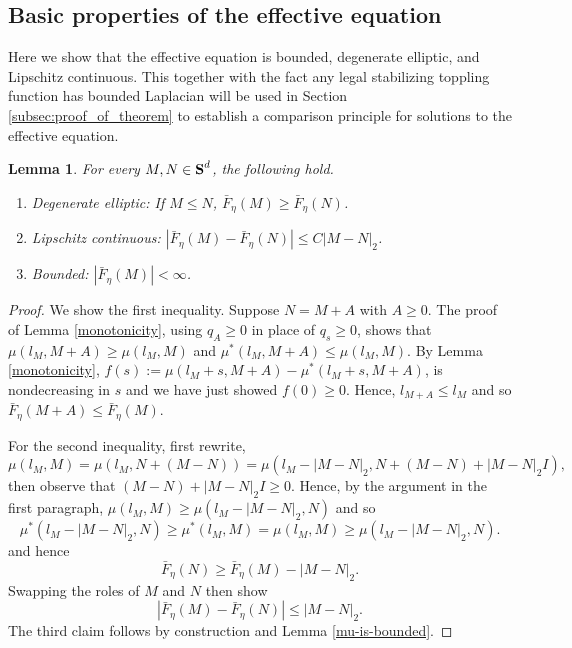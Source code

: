 \documentclass[12pt]{amsart}
\newcommand{\symm}{{\mbox{\bf S}}}  %
\newtheorem{lemma}[theorem]{Lemma}
\begin{document}
\subsection{Basic properties of the effective equation}

Here we show that the effective equation is bounded, degenerate elliptic, and Lipschitz continuous. This together with 
the fact any legal stabilizing toppling function has bounded Laplacian will be used in Section \ref{subsec:proof_of_theorem} to establish a comparison principle for solutions to the effective equation. 

\begin{lemma} \label{lemma:basic_effective}
For every $M, N \in \symm^d$, the following hold. 
\begin{enumerate}
\item
Degenerate elliptic:   If $M \leq N$, $\bar{F}_{\eta}(M) \geq \bar{F}_{\eta}(N)$. 
\item Lipschitz continuous:  $|\bar{F}_{\eta}(M) - \bar{F}_{\eta}(N)| \leq C |M-N|_2$. 
\item Bounded:  $|\bar{F}_{\eta}(M)| < \infty$. 
\end{enumerate}

\end{lemma}

\begin{proof}
We show the first inequality. Suppose $N = M + A$ with $A \geq 0$. 
The proof of Lemma \ref{monotonicity}, using $q_A \geq 0$ in place of $q_s \geq 0$, shows that 
$\mu(l_M, M+A) \geq \mu(l_M, M)$ and $\mu^*(l_M, M+A) \leq \mu(l_M, M)$.
By Lemma \ref{monotonicity}, $f(s) := \mu(l_M+s,M+A) - \mu^*(l_M+s,M+A)$, is nondecreasing in $s$
and we have just showed $f(0) \geq 0$.  Hence, $l_{M+A} \leq l_M$ and so $\bar{F}_{\eta}(M+A) \leq \bar{F}_{\eta}(M)$.  


For the second inequality, first rewrite, 
\[
\mu(l_M, M) = \mu(l_M, N + (M-N)) = \mu(l_M - |M-N|_2, N + (M-N) + |M-N|_2 I ), 
\]
then observe that $(M-N) + |M-N|_2  I \geq 0$. Hence, by the argument in the first paragraph, 
$\mu(l_M, M) \geq \mu(l_M - |M-N|_2, N)$
and so 
\[
\mu^*(l_M - |M-N|_2, N) \geq \mu^*(l_M,M) = \mu(l_M, M) \geq \mu(l_M - |M-N|_2, N).  
\]
and hence 
\[
\bar{F}_{\eta}(N) \geq \bar{F}_{\eta}(M) - |M-N|_2.
\]
Swapping the roles of $M$ and $N$ then show  
\[
|\bar{F}_{\eta}(M) - \bar{F}_{\eta}(N)|  \leq |M-N|_2. 
\]
The third claim follows by construction and Lemma \ref{mu-is-bounded}. 







\end{proof}
\end{document}
